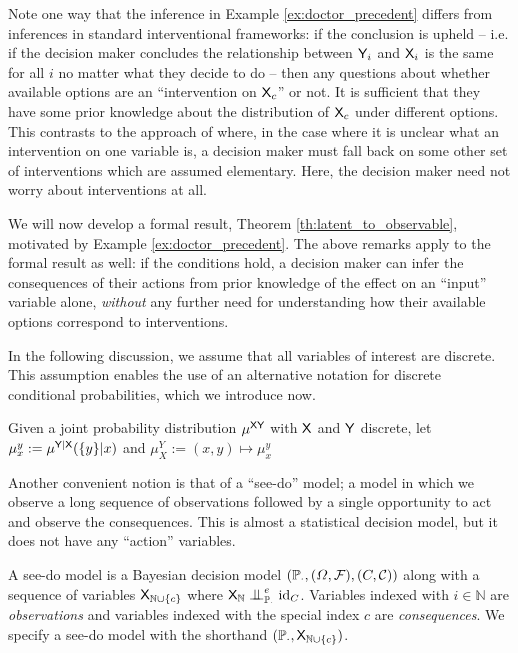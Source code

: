 Note one way that the inference in Example \ref{ex:doctor_precedent} differs from inferences in standard interventional frameworks: if the conclusion is upheld -- i.e. if the decision maker concludes the relationship between $\mathsf{Y}_i$ and $\mathsf{X}_i$ is the same for all $i$ no matter what they decide to do -- then any questions about whether available options are an ``intervention on $\mathsf{X}_c$'' or not. It is sufficient that they have some prior knowledge about the distribution of $\mathsf{X}_c$ under different options. This contrasts to the approach of \citet{spirtesCausalInferenceAmbiguous2004} where, in the case where it is unclear what an intervention on one variable is, a decision maker must fall back on some other set of interventions which are assumed elementary. Here, the decision maker need not worry about interventions at all.

We will now develop a formal result, Theorem \ref{th:latent_to_observable}, motivated by Example \ref{ex:doctor_precedent}. The above remarks apply to the formal result as well: if the conditions hold, a decision maker can infer the consequences of their actions from prior knowledge of the effect on an ``input'' variable alone, \emph{without} any further need for understanding how their available options correspond to interventions. 

In the following discussion, we assume that all variables of interest are discrete. This assumption enables the use of an alternative notation for discrete conditional probabilities, which we introduce now.

\begin{definition}
Given a joint probability distribution $\mu^{\mathsf{XY}}$ with $\mathsf{X}$ and $\mathsf{Y}$ discrete, let $\mu^y_x:=\mu^{\mathsf{Y}|\mathsf{X}}(\{y\}|x)$ and $\mu^Y_X:= (x,y)\mapsto \mu^y_x$
\end{definition}

Another convenient notion is that of a ``see-do'' model; a model in which we observe a long sequence of observations followed by a single opportunity to act and observe the consequences. This is almost a statistical decision model, but it does not have any ``action'' variables.

\begin{definition}
A see-do model is a Bayesian decision model $(\mathbb{P}_\cdot,(\Omega, \mathcal{F}),(C,\mathcal{C}))$ along with a sequence of variables $\mathsf{X}_{\mathbb{N}\cup\{c\}}$ where $\RV{X}_{\mathbb{N}}\CI^e_{\prob{P}_\cdot} \mathrm{id}_C$. Variables indexed with $i\in \mathbb{N}$ are \emph{observations} and variables indexed with the special index $c$ are \emph{consequences}. We specify a see-do model with the shorthand $(\mathbb{P}_\cdot,\mathsf{X}_{\mathbb{N}\cup\{c\}})$.
\end{definition}

